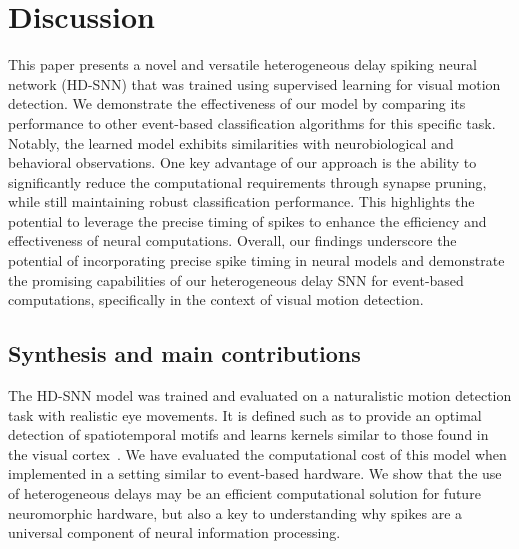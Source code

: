 \documentclass[default]{sn-jnl}%
\theoremstyle{thmstyleone}%
\theoremstyle{thmstyletwo}%
\theoremstyle{thmstylethree}%
\begin{document}
\section{Discussion}
This paper presents a novel and versatile heterogeneous delay spiking neural network (HD-SNN) that was trained using supervised learning for visual motion detection. We demonstrate the effectiveness of our model by comparing its performance to other event-based classification algorithms for this specific task. Notably, the learned model exhibits similarities with neurobiological and behavioral observations.
One key advantage of our approach is the ability to significantly reduce the computational requirements through synapse pruning, while still maintaining robust classification performance. This highlights the potential to leverage the precise timing of spikes to enhance the efficiency and effectiveness of neural computations.
Overall, our findings underscore the potential of incorporating precise spike timing in neural models and demonstrate the promising capabilities of our heterogeneous delay SNN for event-based computations, specifically in the context of visual motion detection.
%
\subsection{Synthesis and main contributions}
The HD-SNN model was trained and evaluated on a naturalistic motion detection task with realistic eye movements. It is defined such as to provide an optimal detection of  spatiotemporal motifs and learns kernels similar to those found in the visual cortex~\cite{deangelis_functional_1999, kremkow_push-pull_2016}. We have evaluated the computational cost of this model when implemented in a setting similar to event-based hardware. We show that the use of heterogeneous delays may be an efficient computational solution for future neuromorphic hardware, but also a key to understanding why spikes are a universal component of neural information processing.
\end{document}
